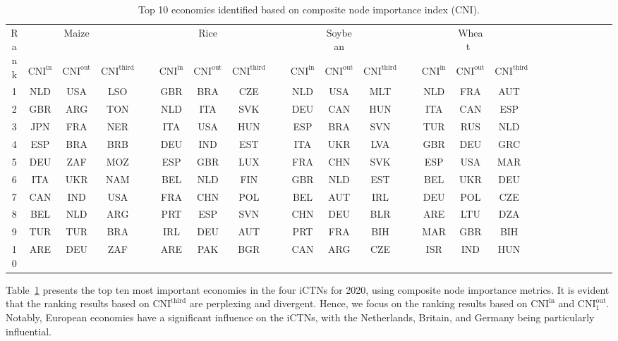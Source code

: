 \documentclass[preprint,3p,times,sort&compress]{elsarticle}
\begin{document}
\begin{table}[!ht]
    \centering
    \renewcommand\tabcolsep{1mm}
    \caption{Top 10 economies identified based on composite node importance index (CNI).}
    \smallskip
    \begin{tabular}{cccccccccccccccccccccccc}
         \toprule
        \multirow{2}{*}{Rank}~&~&Maize & ~ && ~ & Rice & ~ && ~ &Soybean & ~ && ~ & Wheat~&~& \\  
        \cline{2-4} \cline{6-8}\cline{10-12}\cline{14-16}
         & $\mathrm{CNI^{\mathrm{in}}}$ & $\mathrm{CNI^{\mathrm{out}}}$ & $\mathrm{CNI^{third}}$ &&  $\mathrm{CNI^{\mathrm{in}}}$ & $\mathrm{CNI^{\mathrm{out}}}$ & $\mathrm{CNI^{third}}$ & & $\mathrm{CNI^{\mathrm{in}}}$ & $\mathrm{CNI^{\mathrm{out}}}$ & $\mathrm{CNI^{third}}$  & & $\mathrm{CNI^{\mathrm{in}}}$ & $\mathrm{CNI^{\mathrm{out}}}$ & $\mathrm{CNI^{third}}$ \\  
                 \midrule
        1 & NLD & USA & LSO &~& GBR & BRA & CZE &~& NLD & USA & MLT &~& NLD & FRA & AUT~& \\  
        2 & GBR & ARG & TON &~& NLD & ITA & SVK  &~& DEU & CAN & HUN &~& ITA & CAN & ESP~& \\  
        3 & JPN & FRA & NER &~& ITA & USA & HUN &~& ESP & BRA & SVN &~& TUR & RUS & NLD~& \\   
        4 & ESP & BRA & BRB &~& DEU & IND &EST
        &~& ITA & UKR & LVA &~& GBR & DEU & GRC~& \\
        5 & DEU & ZAF & MOZ &~& ESP & GBR & LUX &~& FRA & CHN & SVK &~& ESP & USA & MAR~& \\    
        6 & ITA & UKR & NAM &~& BEL & NLD & FIN &~& GBR & NLD & EST &~& BEL & UKR & DEU~& \\ 
        7 & CAN & IND & USA &~& FRA & CHN & POL  &~& BEL & AUT & IRL &~& DEU & POL & CZE~& \\  
        8 & BEL & NLD & ARG &~& PRT & ESP & SVN &~& CHN & DEU & BLR &~& ARE & LTU & DZA~& \\  
        9 & TUR & TUR & BRA &~& IRL & DEU & AUT &~& PRT & FRA & BIH &~& MAR & GBR & BIH~& \\  
        10 & ARE & DEU & ZAF &~& ARE & PAK & BGR &~& CAN & ARG & CZE &~& ISR & IND & HUN~& \\  
         \bottomrule
    \end{tabular}
    \label{Table:iCTN:CNI:rank}
\end{table}


Table~\ref{Table:iCTN:CNI:rank} presents the top ten most important economies in the four iCTNs for 2020, using composite node importance metrics. It is evident that the ranking results based on $\mathrm{CNI}^{\mathrm{third}}$ are perplexing and divergent. Hence, we focus on the ranking results based on $\mathrm{CNI}^{\mathrm{in}}$ and $\mathrm{CNI}^{\mathrm{out}}_1$. Notably, European economies have a significant influence on the iCTNs, with the Netherlands, Britain, and Germany being particularly influential.
\end{document}
